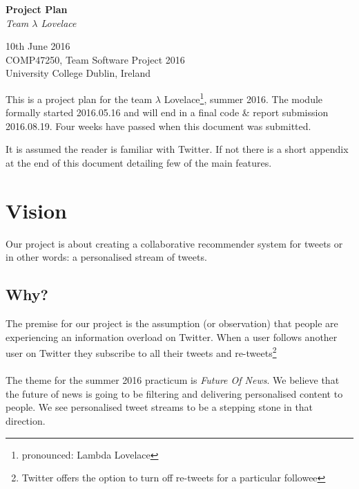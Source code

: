 \documentclass{article}
\begin{document}
\begin{center}
	{\LARGE \textbf{Project Plan}} \\
	\vspace{0.5em}
	\textsl{Team $\lambda$ Lovelace}
\end{center}

\vspace{0.5em}

\begin{center}
	10th June 2016 \\
	COMP47250, Team Software Project 2016 \\ 
	University College Dublin, Ireland \\
\end{center}

\vspace{0.5em}



\noindent This is a project plan for the team $\lambda$ Lovelace\footnote{pronounced: Lambda Lovelace}, summer 2016. The module formally started 2016.05.16 and will end in a final code \& report submission 2016.08.19. Four weeks have passed when this document was submitted.

It is assumed the reader is familiar with Twitter. If not there is a short appendix at the end of this document detailing few of the main features.


\section{Vision}
% 

Our project is about creating a collaborative recommender system for tweets or in other words: a personalised stream of tweets.

\subsection{Why?}
The premise for our project is the assumption (or observation) that people are experiencing an information overload on Twitter. When a user follows another user on Twitter they subscribe to all their tweets and re-tweets\footnote{Twitter offers the option to turn off re-tweets for a particular followee}
\\\\
The theme for the summer 2016 practicum is \textit{Future Of News}. We believe that the future of news is going to be filtering and delivering personalised content to people. We see personalised tweet streams to be a stepping stone in that direction.
\end{document}
